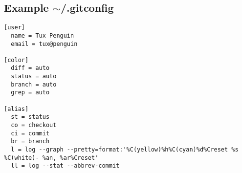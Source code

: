 \subsection{Example $\sim$/.gitconfig}
\begin{frame}[fragile]
  \subslidetitle

\begin{lstlisting}
[user]
  name = Tux Penguin
  email = tux@penguin

[color]
  diff = auto
  status = auto
  branch = auto
  grep = auto

[alias]
  st = status
  co = checkout
  ci = commit
  br = branch
  l = log --graph --pretty=format:'%C(yellow)%h%C(cyan)%d%Creset %s %C(white)- %an, %ar%Creset'
  ll = log --stat --abbrev-commit
\end{lstlisting}
\end{frame}
